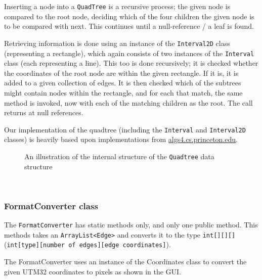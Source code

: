 \documentclass[a4paper,11pt]{article}
\begin{document}
Inserting a node into a \texttt{QuadTree} is a recursive process; the given node is compared to the root node, deciding which of the four children the given node is to be compared with next. This continues until a null-reference / a leaf is found.

Retrieving information is done using an instance of the \texttt{Interval2D} class (representing a rectangle), which again consists of two instances of the \texttt{Interval} class (each representing a line). This too is done recursively; it is checked whether the coordinates of the root node are within the given rectangle. If it is, it is added to a given collection of edges. It is then checked which of the subtrees might contain nodes within the rectangle, and for each that match, the same method is invoked, now with each of the matching children as the root. The call returns at null references.

Our implementation of the quadtree (including the \texttt{Interval} and \texttt{Interval2D} classes) is heavily based upon implementations from \url{algs4.cs.princeton.edu}.
\\
\begin{figure}[!h]
\centering
{}
	\caption{An illustration of the internal structure of the \texttt{Quadtree} data structure}
\end{figure}
\\
\subsubsection{FormatConverter class} %
The \texttt{FormatConverter} has static methods only, and only one public method. This methods takes an \texttt{ArrayList<Edge>} and converts it to the type \texttt{int[][][]} \\(\texttt{int[type][number of edges][edge coordinates]}).

The FormatConverter uses an instance of the Coordinates class to convert the given UTM32 coordinates to pixels as shown in the GUI.
\end{document}
